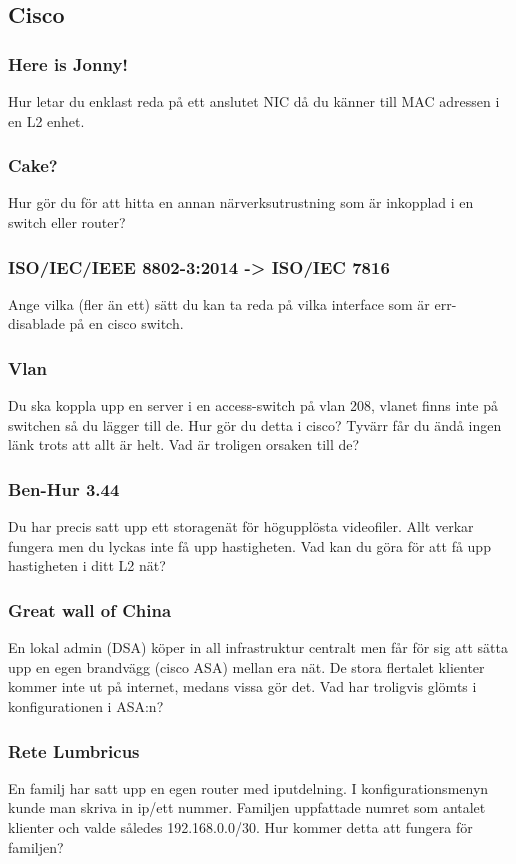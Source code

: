 \documentclass[a4paper]{report}
\begin{document}
\subsection{Cisco}
\subsubsection{Here is Jonny!}
Hur letar du enklast reda på ett anslutet NIC då du känner till MAC adressen i en L2 enhet.

\subsubsection{Cake?}
Hur gör du för att hitta en annan närverksutrustning som är inkopplad i en switch eller router?

\subsubsection{ISO/IEC/IEEE 8802-3:2014 -> ISO/IEC 7816}
Ange vilka (fler än ett) sätt du kan ta reda på vilka interface som är err-disablade på en cisco switch.

\subsubsection{Vlan}
Du ska koppla upp en server i en access-switch på vlan 208, vlanet finns inte på switchen så du lägger till de. Hur gör du detta i cisco?
Tyvärr får du ändå ingen länk trots att allt är helt. Vad är troligen orsaken till de?

\subsubsection{Ben-Hur 3.44}
Du har precis satt upp ett storagenät för högupplösta videofiler. Allt verkar fungera men du lyckas inte få upp hastigheten. Vad kan du göra för att få upp hastigheten i ditt L2 nät?

\subsubsection{Great wall of China}
En lokal admin (DSA) köper in all infrastruktur centralt men får för sig att sätta upp en egen brandvägg (cisco ASA) mellan era nät. De stora flertalet klienter kommer inte ut på internet, medans vissa gör det. Vad har troligvis glömts i konfigurationen i ASA:n? 

\subsubsection{Rete Lumbricus}
En familj har satt upp en egen router med iputdelning. I konfigurationsmenyn kunde man skriva in ip/ett nummer. Familjen uppfattade numret som antalet klienter och valde således 192.168.0.0/30. Hur kommer detta att fungera för familjen?
\end{document}
